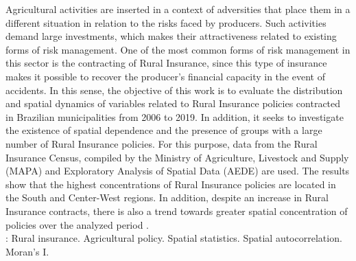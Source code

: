 Agricultural activities are inserted in a context of adversities that place them in a different situation in relation to the risks faced by producers. Such activities demand large investments, which makes their attractiveness related to existing forms of risk management. One of the most common forms of risk management in this sector is the contracting of Rural Insurance, since this type of insurance makes it possible to recover the producer's financial capacity in the event of accidents. In this sense, the objective of this work is to evaluate the distribution and spatial dynamics of variables related to Rural Insurance policies contracted in Brazilian municipalities from 2006 to 2019. In addition, it seeks to investigate the existence of spatial dependence and the presence of groups with a large number of Rural Insurance policies. For this purpose, data from the Rural Insurance Census, compiled by the Ministry of Agriculture, Livestock and Supply (MAPA) and Exploratory Analysis of Spatial Data (AEDE) are used. The results show that the highest concentrations of Rural Insurance policies are located in the South and Center-West regions. In addition, despite an increase in Rural Insurance contracts, there is also a trend towards greater spatial concentration of policies over the analyzed period . \\
\newline
{}: Rural insurance. Agricultural policy. Spatial statistics. Spatial autocorrelation. Moran's I. 
